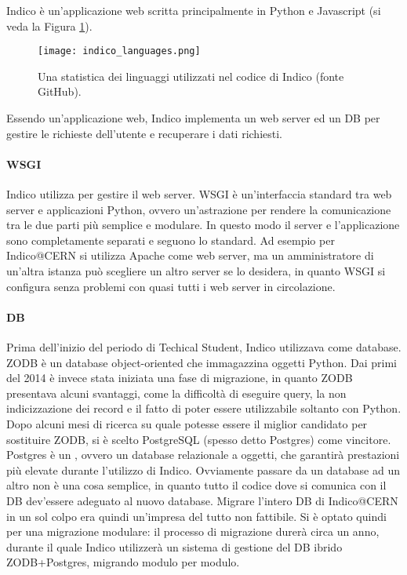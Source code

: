		Indico è un'applicazione web scritta principalmente in Python e Javascript (si veda la Figura \ref{fig:indico_languages}).
		
		\begin{figure}[h!]
			\begin{center}
				\texttt{[image: indico\_languages.png]}
			\end{center}
			\caption[Linguaggi di Indico]{Una statistica dei linguaggi utilizzati nel codice di Indico (fonte GitHub).}
			\label{fig:indico_languages}
		\end{figure}
		
		Essendo un'applicazione web, Indico implementa un web server ed un \ac{DB} per gestire le richieste dell'utente e recuperare i dati richiesti.
		
		\paragraph{WSGI}Indico utilizza  per gestire il web server. \ac{WSGI} è un'interfaccia standard tra web server e applicazioni Python, ovvero un'astrazione per rendere la comunicazione tra le due parti più semplice e modulare. In questo modo il server e  l'applicazione sono completamente separati e seguono lo standard. Ad esempio per Indico@CERN si utilizza Apache come web server, ma un amministratore di un'altra istanza può scegliere un altro server se lo desidera, in quanto \ac{WSGI} si configura senza problemi con quasi tutti i web server in circolazione. \cite{indico:wsgi}
		
		\paragraph{DB}Prima dell'inizio del periodo di Techical Student, Indico utilizzava  come database. \ac{ZODB} è un database object-oriented che immagazzina oggetti Python. Dai primi del 2014 è invece stata iniziata una fase di migrazione, in  quanto \ac{ZODB} presentava alcuni svantaggi, come la difficoltà di eseguire query, la non indicizzazione dei record e il fatto di poter essere utilizzabile soltanto con Python. Dopo alcuni mesi di ricerca su quale potesse essere il miglior candidato per sostituire \ac{ZODB}, si è scelto PostgreSQL (spesso detto Postgres) come vincitore. Postgres è un , ovvero un database relazionale a oggetti, che garantirà prestazioni più elevate durante l'utilizzo di Indico. Ovviamente passare da un database ad un altro non è una cosa semplice, in quanto tutto il codice dove si comunica con il \ac{DB} dev'essere adeguato al nuovo database. Migrare l'intero \ac{DB} di Indico@CERN in un sol colpo era quindi un'impresa del tutto non fattibile. Si è optato quindi per una migrazione modulare: il processo di migrazione durerà circa un anno, durante il quale Indico utilizzerà un sistema di gestione del \ac{DB} ibrido \ac{ZODB}+Postgres, migrando modulo per modulo. \cite{indico:zodb}\cite{pedro:chep}
		
